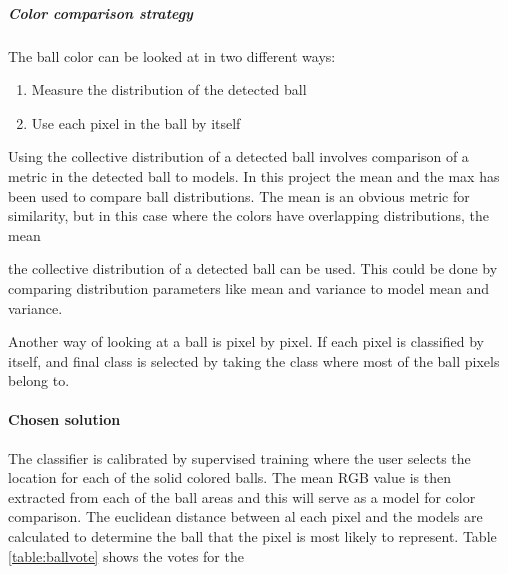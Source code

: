 \subparagraph{Color comparison strategy}
The ball color can be looked at in two different ways: 
\begin{enumerate}
  \item Measure the distribution of the detected ball
  \item Use each pixel in the ball by itself
\end{enumerate}

Using the collective distribution of a detected ball involves comparison of a metric in the detected ball to models. In this project the mean and the max has been used to compare ball distributions. The mean is an obvious metric for similarity, but in this case where the colors have overlapping distributions, the mean  

the collective distribution of a detected ball can be used. This could be done by comparing distribution parameters like mean and variance to model mean and variance.

Another way of looking at a ball is pixel by pixel. If each pixel is classified by itself, and final class is selected by taking the class where most of the ball pixels belong to.

\paragraph{Chosen solution}

The classifier is calibrated by supervised training where the user selects the location for each of the solid colored balls. The mean RGB value is then extracted from each of the ball areas and this will serve as a model for color comparison. 
The euclidean distance between al each pixel and the models are calculated to determine the ball that the pixel is most likely to represent.  Table \ref{table:ballvote} shows the votes for the
